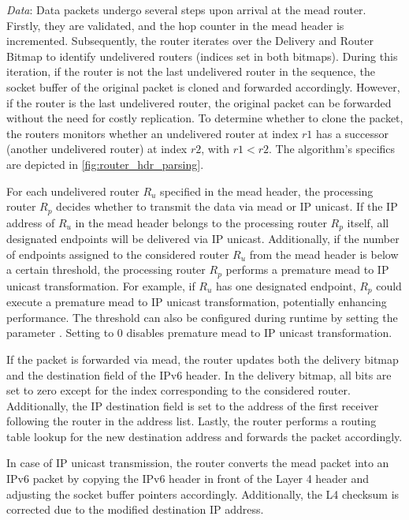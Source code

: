\textit{Data}: Data packets undergo several steps upon arrival at the \gls{mead}
    router.
Firstly, they are validated, and the hop counter in the \gls{mead} header is
    incremented.
Subsequently, the router iterates over the Delivery and Router Bitmap to
    identify undelivered routers (indices set in both bitmaps).
During this iteration, if the router is not the last undelivered router in the
    sequence, the socket buffer of the original packet is cloned and forwarded
    accordingly.
However, if the router is the last undelivered router, the original packet can
    be forwarded without the need for costly replication.
To determine whether to clone the packet, the routers monitors whether an 
    undelivered router at index $r1$ has a successor (another undelivered
    router) at index $r2$, with $r1 < r2$.
The algorithm's specifics are depicted in \autoref{fig:router_hdr_parsing}.

For each undelivered router $R_u$ specified in the \gls{mead} header, the
    processing router $R_p$ decides whether to transmit the data via \gls{mead}
    or IP unicast.
If the IP address of $R_u$ in the \gls{mead} header belongs to the processing
    router $R_p$ itself, all designated endpoints will be delivered via IP
    unicast.
Additionally, if the number of endpoints assigned to the considered router
    $R_u$ from the \gls{mead} header is below a certain threshold, the processing
    router $R_p$ performs a premature \gls{mead} to IP unicast transformation.
For example, if $R_u$ has one designated endpoint, $R_p$ could execute a
    premature \gls{mead} to IP unicast transformation, potentially enhancing
    performance.
The threshold can also be configured during runtime by setting the parameter
    .
Setting  to 0 disables premature \gls{mead} to IP unicast
    transformation.

If the packet is forwarded via \gls{mead}, the router updates both the delivery
    bitmap and the destination field of the IPv6 header.
In the delivery bitmap, all bits are set to zero except for the index
    corresponding to the considered router.
Additionally, the IP destination field is set to the address of the first
    receiver following the router in the address list.
Lastly, the router performs a routing table lookup for the new destination
    address and forwards the packet accordingly.

In case of IP unicast transmission, the router converts the \gls{mead} packet
    into an IPv6 packet by copying the IPv6 header in front of the Layer 4
    header and adjusting the socket buffer pointers accordingly.
Additionally, the L4 checksum is corrected due to the modified destination IP
    address.

